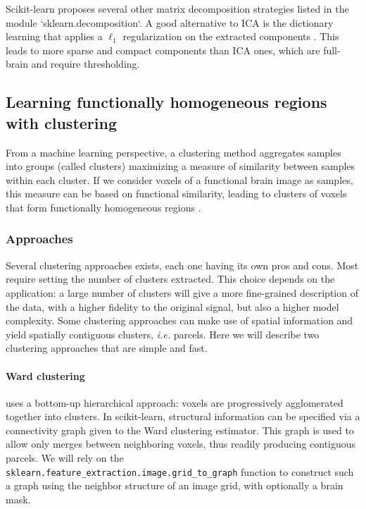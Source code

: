 \documentclass{frontiersSCNS} %
\begin{document}
Scikit-learn proposes several other matrix decomposition strategies listed in
the module `sklearn.decomposition`. A good alternative to ICA is the dictionary
learning that applies a $\ell_1$ regularization on the extracted components
\citep{varoquaux2011}.
This leads to more sparse and compact components than ICA ones, which are
full-brain and require thresholding. 


\subsection{Learning functionally homogeneous regions with clustering}
\label{clustering}

From a machine learning perspective, a clustering method aggregates 
samples into groups (called clusters) maximizing a measure of similarity
between samples within each cluster. If we consider voxels of a functional brain image
as samples, this 
measure can be based on functional similarity, leading to clusters of voxels
that form functionally homogeneous regions \citep{thirion2006}.

\subsubsection{Approaches}

Several clustering approaches exists, each one having its own pros and
cons. Most require setting the number of clusters extracted. This choice
depends on the application: a large number of clusters will give a more
fine-grained description of the data, with a higher fidelity to the
original signal, but also a higher model complexity. Some clustering
approaches can make use of spatial information and yield
spatially contiguous clusters, \emph{i.e.} parcels. Here we will describe
two clustering approaches that are simple and fast.

\paragraph{Ward clustering} uses a bottom-up hierarchical approach:
voxels are progressively agglomerated together into clusters. In
scikit-learn, structural information can be specified via a connectivity
graph given to the Ward clustering estimator. This graph is used to allow
only merges between neighboring voxels, thus readily producing contiguous
parcels. We will rely on the {\tt
sklearn.feature\_extraction.image.grid\_to\_graph} function to
construct such a graph using the neighbor structure of an image grid,
with optionally a brain mask.
\end{document}
